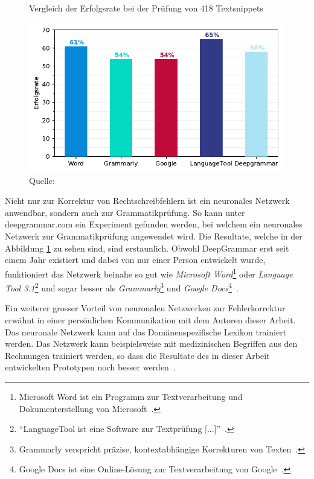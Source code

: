 \begin{figure}[h!] %
    \centering
    \captionsetup{width=.9\linewidth}
    \caption{Vergleich der Erfolgsrate bei der Prüfung von 418 Textsnippets}
    \label{deepgrammar}
    \includegraphics{graphics/matplot/grammar-tools.pdf}
    \caption*{Quelle: \textcite{Mugan}}
\end{figure} %
Nicht nur zur Korrektur von Rechtschreibfehlern ist ein neuronales Netzwerk anwendbar, sondern auch zur Grammatikprüfung. So kann unter deepgrammar.com ein Experiment gefunden werden, bei welchem ein neuronales Netzwerk zur Grammatikprüfung angewendet wird. Die Resultate, welche in der Abbildung \ref{deepgrammar} zu sehen sind, sind erstaunlich. Obwohl DeepGrammar erst seit einem Jahr existiert und dabei von nur einer Person entwickelt wurde, funktioniert das Netzwerk beinahe so gut wie \textit{Microsoft Word}\footnote{Microsoft Word ist ein Programm zur Textverarbeitung und Dokumenterstellung von Microsoft~\autocite{MicrosoftCorporation2018}.} oder \textit{Language Tool 3.1}\footnote{\enquote{LanguageTool ist eine Software zur Textprüfung [...]}~\autocite{LanguageTool2018}.} und sogar besser als \textit{Grammarly}\footnote{Grammarly verspricht präzise, kontextabhängige Korrekturen von Texten~\autocite{GrammarlyInc.2018}.} und \textit{Google Docs}\footnote{Google Docs ist eine Online-Lösung zur Textverarbeitung von Google~\autocite{GoogleLLC2018}.}~\autocite{Mugan}.


Ein weiterer grosser Vorteil von neuronalen Netzwerken zur Fehlerkorrektur erwähnt \textcite{Mugan2018} in einer persönlichen Kommunikation mit dem Autoren dieser Arbeit. Das neuronale Netzwerk kann auf das Domänenspezifische Lexikon trainiert werden. Das Netzwerk kann beispielsweise mit medizinischen Begriffen aus den Rechnungen trainiert werden, so dass die Resultate des in dieser Arbeit entwickelten Prototypen noch besser werden~\autocite{Mugan2018}.

